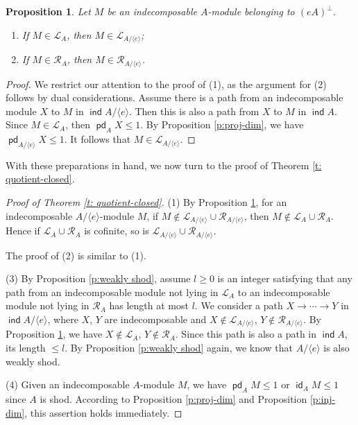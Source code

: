 \documentclass[12pt,a4paper,reqno]{amsart}
\newtheorem{proposition}[theorem]{Proposition}
\theoremstyle{definition}
\newcommand{\opname}[1]{\operatorname{\mathsf{#1}}}
\newcommand{\ind}{\opname{ind}}
\newcommand{\pd}{\opname{pd}}
\newcommand{\id}{\opname{id}}
\begin{document}
\begin{proposition}\label{p:L and R}
Let $M$ be an indecomposable $A$-module belonging to $(eA)^\perp$. 
\begin{enumerate}
\item If $M \in \mathcal{L}_A$, then  $M \in \mathcal{L}_{A / \langle e \rangle}$;
\item If $M \in \mathcal{R}_A$, then  $M \in \mathcal{R}_{A / \langle e \rangle}$.
\end{enumerate}
\end{proposition}
\begin{proof}
We restrict our attention to the proof of (1), as the argument for (2) follows by dual considerations. Assume there is a path from an indecomposable module $X$ to $M$ in $\ind A / \langle e \rangle$. Then this is also a path from $X$ to $M$ in $\ind A$. Since $M \in \mathcal{L}_A$, then $\pd_A X \leq 1$. By Proposition \ref{p:proj-dim}, we have $\pd_{A / \langle e \rangle} X \leq 1$. It follows that $M \in \mathcal{L}_{A / \langle e \rangle}$.
\end{proof} 


With these preparations in hand, we now turn to the proof of Theorem \ref{t: quotient-closed}.

\begin{proof}[Proof of Theorem \ref{t: quotient-closed}]
(1) By Proposition \ref{p:L and R}, for an indecomposable $A / \langle e \rangle$-module $M$, if $M \notin \mathcal{L}_{A / \langle e \rangle} \cup \mathcal{R}_{A / \langle e \rangle}$, then $M \notin \mathcal{L}_A \cup \mathcal{R}_A$. Hence if $\mathcal{L}_A \cup \mathcal{R}_A$ is cofinite, so is $\mathcal{L}_{A / \langle e \rangle} \cup \mathcal{R}_{A / \langle e \rangle}$.

The proof of (2) is similar to (1).

(3) By Proposition \ref{p:weakly shod}, assume $l \geq 0$ is an integer satisfying that any path from an indecomposable module not lying in $\mathcal{L}_A$ to an indecomposable module not lying in $\mathcal{R}_A$ has length at most $l$. We consider a path $X \to \cdots \to Y$ in $\ind A / \langle e \rangle$, where $X$, $Y$ are indecomposable and $X \notin \mathcal{L}_{A / \langle e \rangle}$, $Y \notin \mathcal{R}_{A / \langle e \rangle}$. By Proposition \ref{p:L and R}, we have $X \notin \mathcal{L}_A$, $Y \notin \mathcal{R}_A$. Since this path is also a path in $\ind A$, its length $\leq l$. By Proposition \ref{p:weakly shod} again, we know that $A / \langle e \rangle$ is also weakly shod.


(4) Given an indecomposable $A$-module $M$, we have $\pd_A M \leq 1$ or $\id_A M \leq 1$ since $A$ is shod. According to Proposition \ref{p:proj-dim} and Proposition \ref{p:inj-dim}, this assertion holds immediately.
\end{proof} 
\end{document}
